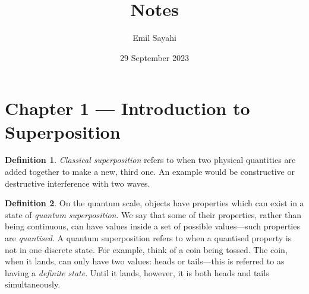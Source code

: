 \documentclass{article}
\title{Notes}
\author{Emil Sayahi}
\date{29 September 2023}
\theoremstyle{definition}
\newtheorem{definition}{Definition}[section]
\begin{document}
\maketitle









\section{Chapter 1 --- Introduction to Superposition}

\begin{definition}
    \emph{Classical superposition} refers to when two physical quantities are added together to make a new, third one. An example would be constructive or destructive interference with two waves.
\end{definition}
\begin{definition}
    On the quantum scale, objects have properties which can exist in a state of \emph{quantum superposition}. We say that some of their properties, rather than being continuous, can have values inside a set of possible values---such properties are \emph{quantised}. A quantum superposition refers to when a quantised property is not in one discrete state. For example, think of a coin being tossed. The coin, when it lands, can only have two values: heads or tails---this is referred to as having a \emph{definite state}. Until it lands, however, it is both heads and tails simultaneously.
\end{definition}
\end{document}
